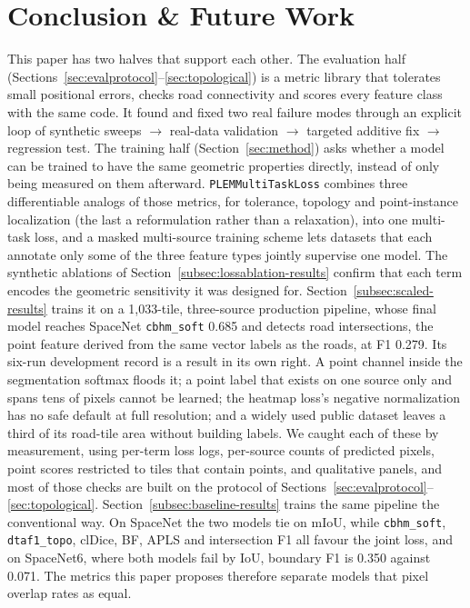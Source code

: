 \section{Conclusion \& Future Work}
\label{sec:conclusion}

This paper has two halves that support each other. The evaluation half
(Sections~\ref{sec:evalprotocol}--\ref{sec:topological}) is a metric library that tolerates small
positional errors, checks road connectivity and scores every feature class with the same code. It
found and fixed two real failure modes through an explicit loop of
synthetic sweeps $\to$ real-data validation $\to$ targeted additive fix $\to$ regression test. The
training half (Section~\ref{sec:method}) asks whether a model can be trained to have the same
geometric properties directly, instead of only being measured on them afterward.
\texttt{PLEMMultiTaskLoss} combines three differentiable analogs of those metrics, for tolerance,
topology and point-instance localization (the last a reformulation rather than a relaxation), into
one multi-task loss, and a masked multi-source training scheme lets datasets that each annotate
only some of the three feature types jointly supervise one model. The synthetic ablations of
Section~\ref{subsec:lossablation-results} confirm that each term encodes the geometric sensitivity
it was designed for. Section~\ref{subsec:scaled-results} trains it on a 1,033-tile,
three-source production pipeline, whose final model reaches SpaceNet \texttt{cbhm\_soft} 0.685 and
detects road intersections, the point feature derived from the same vector labels as the roads, at
F1 0.279. Its six-run development record is a result in its own right. A point channel inside the
segmentation softmax floods it; a point label that exists on one source only and spans tens of
pixels cannot be learned; the heatmap loss's negative normalization has no safe default at full
resolution; and a widely used public dataset leaves a third of its road-tile area without building
labels. We caught each of these by measurement, using per-term loss logs, per-source counts of
predicted pixels, point scores restricted to tiles that contain points, and qualitative panels, and
most of those checks are built on the protocol of
Sections~\ref{sec:evalprotocol}--\ref{sec:topological}. Section~\ref{subsec:baseline-results}
trains the same pipeline the conventional way. On SpaceNet the two models tie on mIoU, while
\texttt{cbhm\_soft}, \texttt{dtaf1\_topo}, clDice, BF, APLS and intersection F1 all favour the
joint loss, and on SpaceNet6, where both models fail by IoU, boundary F1 is 0.350 against 0.071.
The metrics this paper proposes therefore separate models that pixel overlap rates as equal.

